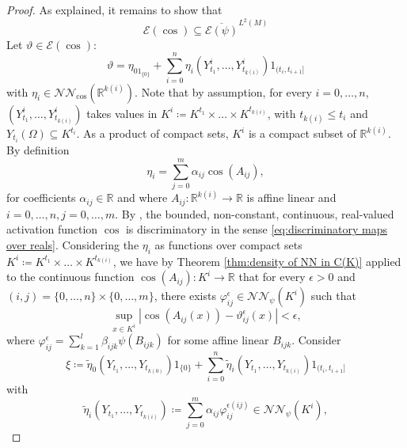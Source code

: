 \documentclass[11pt,a4paper,twoside,openany]{report}
\numberwithin{equation}{section}
\theoremstyle{plain} %
\theoremstyle{definition} %
\theoremstyle{remark} %
\let\parencite\authnumparencite
\begin{document}
\begin{proof}
As explained, it remains to show that 
    \begin{equation*}
    \mathcal{E}(\cos)\subseteq \overline{\mathcal{E}(\psi)}^{L^2(M)}
\end{equation*}
Let \(\vartheta\in\mathcal{E}(\cos)\):
\begin{equation*}
    \vartheta = \eta_01_{\{0\}}+\sum_{i=0}^n \eta_i(Y_{t_1}^i,\dots,Y_{t_{k(i)}}^i)1_{(t_i,t_{i+1}]}
\end{equation*}
with \(\eta_i\in\mathcal{NN}_{\cos}(\mathbb{R}^{k(i)})\). Note that by assumption, for every \(i=0,\dots,n\), \((Y_{t_1}^i,\dots,Y_{t_{k(i)}}^i)\) takes values in \(K^i\coloneqq K^{t_1}\times\dots\times K^{t_{k(i)}}\), with \(t_{k(i)}\leq t_i\) and \(Y_{t_i}(\Omega)\subseteq K^{t_i}\). As a product of compact sets, \(K^i\) is a compact subset of \(\mathbb{R}^{k(i)}\). By definition 
\begin{equation*}
    \eta_i=\sum_{j=0}^m\alpha_{ij}\cos(A_{ij}),
\end{equation*}
for coefficients \(\alpha_{ij}\in\mathbb{R}\) and
where \(A_{ij}:\mathbb{R}^{k(i)}\to\mathbb{R}\) is affine linear and \(i=0,\dots,n,j=0,\dots,m\).
By \parencite[Thm.~2]{Hornik1991}, the bounded, non-constant, continuous, real-valued activation function \(\cos\) is discriminatory in the sense \eqref{eq:discriminatory maps over reals}. Considering the \(\eta_i\) as functions over compact sets \(K^i\coloneqq K^{t_1}\times\dots\times K^{t_{k(i)}}\), we have by Theorem \ref{thm:density of NN in C(K)} applied to the continuous function \(\cos(A_{ij}):K^i\to\mathbb{R}\) that for every \(\epsilon>0\) and \((i,j)=\{0,\dots,n\}\times\{0,\dots,m\}\), there exists \(\varphi_{ij}^{\epsilon}\in\mathcal{NN}_{\psi}(K^i)\) such that 
\begin{equation*}
    \sup_{x\in K^i}|\cos(A_{ij}(x))-\vartheta_{ij}^{\epsilon}(x)|<\epsilon,
\end{equation*}
where \(\varphi_{ij}^{\epsilon}=\sum_{k=1}^l\beta_{ijk}\psi(B_{ijk})\) for some affine linear \(B_{ijk}\). Consider
\begin{equation*}
    \xi \coloneqq \widetilde{\eta}_0(Y_{t_1},\dots,Y_{t_{k(0)}})1_{\{ 0\}}+\sum_{i=0}^n\widetilde{\eta}_i(Y_{t_1},\dots,Y_{t_{k(i)}})1_{(t_i,t_{i+1}]}
\end{equation*}
with
\begin{equation*}
    \widetilde{\eta}_i(Y_{t_1},\dots,Y_{t_{k(i)}})\coloneqq\sum_{j=0}^m\alpha_{ij}\varphi_{ij}^{\epsilon(ij)}\in \mathcal{NN}_{\psi}(K^i),
\end{equation*}

\end{proof}
\end{document}
